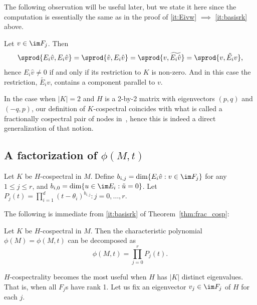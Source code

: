 The following observation will be useful later, but we state it here since the computation is essentially the same as in the proof of \ref{it:Eivw} $\implies $ \ref{it:basisrk} above.

\begin{prop}\label{claim:nonzeroEv}
Let $v \in \im F_j$. Then 
\[ \sprod{E_i \hat{v}, E_i \hat{v}} = \sprod{\hat{v}, E_i \hat{v}} = \sprod{v, \widetilde{E_i \hat{v}}} = \sprod{ v, \tilde{E_i} v},\]
hence  $E_i \hat{v} \neq 0$ if and only if its restriction to $K$ is non-zero. And in this case the restriction, $\tilde{E_i} v$, contains a component parallel to $v$.
\end{prop}

\begin{rema}\label{rem:equiv_def}
In the case when $|K| = 2$ and $H$ is a 2-by-2 matrix with eigenvectors $(p,q)$ and $(-q, p)$, our definition of $K$-cospectral coincides with what is called a fractionally cospectral pair of nodes in~\cite[Theorem 3.3, condition (ii)]{chan2020fundamentals}, hence this is indeed a direct generalization of that notion. 
\end{rema}

\subsection{A factorization of \texorpdfstring{$\phi(M,t)$}{phi(M,t)}}

\begin{defi}
Let $K$ be $H$-cospectral in $M$. Define $b_{i,j} = \dim \{ E_i \hat{v} : v \in
\im F_j \}$ for any $1 \leq j \leq r$, and $b_{i,0} = \dim \{u \in \im E_i : \tilde{u} = 0\}$.  Let $P_j(t) = \prod_{i=1}^d (t-\theta_i)^{b_{i,j}} : j = 0,\dots, r$. 
\end{defi}


The following is immediate from \ref{it:basisrk} of Theorem~\ref{thm:frac_cosp}:
\begin{coro}\label{cor:phiMfactor}
Let $K$ be $H$-cospectral in $M$. Then the characteristic polynomial $\phi(M) = \phi(M,t)$ can be decomposed as 
\[ \phi(M,t) = \prod_{j=0}^r P_j(t). \]
\end{coro}

$H$-cospectrality becomes the most useful when $H$ has $|K|$ distinct eigenvalues. That is, when all $F_j$s have rank 1. Let us fix an eigenvector $v_j \in \im F_j$ of $H$ for each $j$.  


